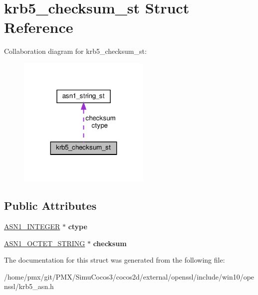 \hypertarget{structkrb5__checksum__st}{}\section{krb5\+\_\+checksum\+\_\+st Struct Reference}
\label{structkrb5__checksum__st}


Collaboration diagram for krb5\+\_\+checksum\+\_\+st\+:
\nopagebreak
\begin{figure}[H]
\begin{center}
\leavevmode
\includegraphics[width=179pt]{structkrb5__checksum__st__coll__graph}
\end{center}
\end{figure}
\subsection*{Public Attributes}
\begin{DoxyCompactItemize}
\item 
\mbox{\label{structkrb5__checksum__st_ae066058605d0c59e10a98fbd71745705}} 
\hyperlink{structasn1__string__st}{A\+S\+N1\+\_\+\+I\+N\+T\+E\+G\+ER} $\ast$ {\bfseries ctype}
\item 
\mbox{\label{structkrb5__checksum__st_aaecf3ca4c97259edba8bc729103d81ba}} 
\hyperlink{structasn1__string__st}{A\+S\+N1\+\_\+\+O\+C\+T\+E\+T\+\_\+\+S\+T\+R\+I\+NG} $\ast$ {\bfseries checksum}
\end{DoxyCompactItemize}


The documentation for this struct was generated from the following file\+:\begin{DoxyCompactItemize}
\item 
/home/pmx/git/\+P\+M\+X/\+Simu\+Cocos3/cocos2d/external/openssl/include/win10/openssl/krb5\+\_\+asn.\+h\end{DoxyCompactItemize}
